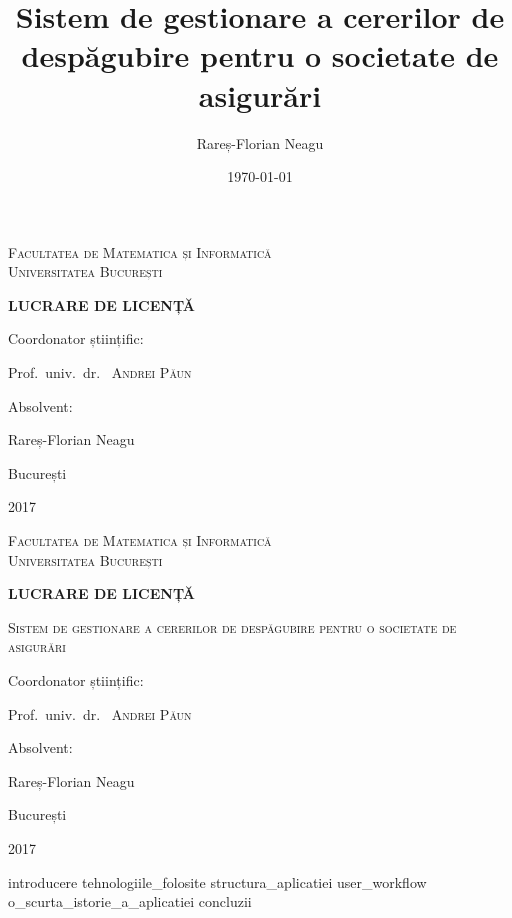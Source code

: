 \documentclass[a4paper,12pt]{report}
\title{Sistem de gestionare a cererilor de despăgubire pentru o societate de asigurări}
\author{Rareș-Florian Neagu}
\date{\today}
\begin{document}

\begin{titlepage}
	\centering
	{\scshape\Large Facultatea de Matematica și Informatică \\ Universitatea București\par}
	\vspace{6cm}
	{\Huge\bfseries LUCRARE DE LICENȚĂ\par}
	\vspace{5.5cm}
	\vfill
	{\flushleft\Large Coordonator științific:\par
	Prof.~univ.~dr.~ \textsc{Andrei Păun}\par}
	\vspace{1cm}
	{\flushright\Large Absolvent:\par Rareș-Florian Neagu\par}

	\vfill

	{\large București\par 2017\par}
\end{titlepage}


\begin{titlepage}
	\centering
	{\scshape\Large Facultatea de Matematica și Informatică \\ Universitatea București\par}
	\vspace{6cm}
	{\huge\bfseries LUCRARE DE LICENȚĂ\par}
	\vspace{1.5cm}
	{\scshape\LARGE Sistem de gestionare a cererilor de despăgubire pentru o societate de asigurări  \par}
	\vspace{2cm}
	\vfill
	{\flushleft\Large Coordonator științific:\par
	Prof.~univ.~dr.~ \textsc{Andrei Păun}\par}
	\vspace{1cm}
	{\flushright\Large Absolvent:\par Rareș-Florian Neagu\par}

	\vfill

	{\large București\par 2017\par}
\end{titlepage}

\tableofcontents
\newpage
{introducere}
\newpage
{tehnologiile_folosite}
\newpage
{structura_aplicatiei}
\newpage
{user_workflow}
\newpage
{o_scurta_istorie_a_aplicatiei}
\newpage
{concluzii}
\newpage
{}
\printbibliography[title={Bibliografie}]
\end{document}

